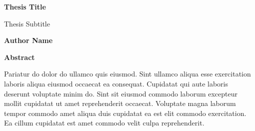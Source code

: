 \thispagestyle{plain}
\begin{center}
    \Large
    \textbf{Thesis Title}
    
    \vspace{0.4cm}
    \large
    Thesis Subtitle

    \vspace{0.4cm}
    \textbf{Author Name}

    \vspace{0.9cm}
    \textbf{Abstract}

\end{center}
    Pariatur do dolor do ullamco quis eiusmod. Sint ullamco aliqua esse exercitation laboris aliqua eiusmod occaecat ea consequat. Cupidatat qui aute laboris deserunt voluptate minim do. Sint sit eiusmod commodo laborum excepteur mollit cupidatat ut amet reprehenderit occaecat. Voluptate magna laborum tempor commodo amet aliqua duis cupidatat ea est elit commodo exercitation. Ea cillum cupidatat est amet commodo velit culpa reprehenderit.